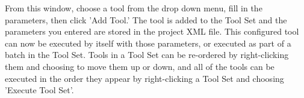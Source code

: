 From this window, choose a tool from the drop down menu, fill in the parameters, then click 'Add Tool.'  The tool is added to the Tool Set and the parameters you entered are stored in the project XML file.  This configured tool can now be executed by itself with those parameters, or executed as part of a batch in the Tool Set.  Tools in a Tool Set can be re-ordered by right-clicking them and choosing to move them up or down, and all of the tools can be executed in the order they appear by right-clicking a Tool Set and choosing 'Execute Tool Set'.
